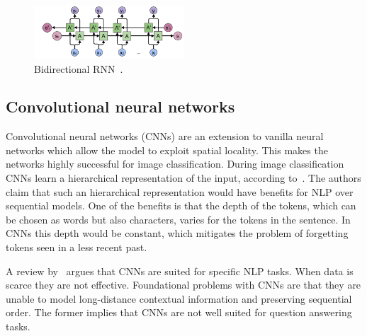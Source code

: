 \begin{figure}[htbp]
    \begin{center}
        \includegraphics[width=0.5\textwidth]{figures/bidirectional.png}
    \end{center}
    \caption{Bidirectional RNN~\citep{olah2015}.}
    \label{fig:bidirectional}
\end{figure}

\subsection{Convolutional neural networks}
\label{subsec:cnn}
Convolutional neural networks (CNNs) are an extension to vanilla neural networks which allow the model to exploit spatial locality.
This makes the networks highly successful for image classification.
During image classification CNNs learn a hierarchical representation of the input, according to~\citet{conneau2016very}.
The authors claim that such an hierarchical representation would have benefits for NLP over sequential models.
One of the benefits is that the depth of the tokens, which can be chosen as words but also characters, varies for the tokens in the sentence.
In CNNs this depth would be constant, which mitigates the problem of forgetting tokens seen in a less recent past.

A review by~\citet{young2018recent} argues that CNNs are suited for specific NLP tasks.
When data is scarce they are not effective.
Foundational problems with CNNs are that they are unable to model long-distance contextual information and preserving sequential order.
The former implies that CNNs are not well suited for question answering tasks.

